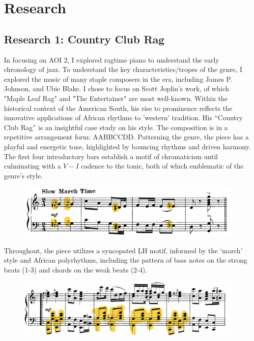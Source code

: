 \documentclass[11pt,a4paper]{article}
\begin{document}
\section{Research}

\subsection{Research 1: Country Club Rag}

In focusing on AOI 2, I explored ragtime piano to understand the early chronology of jazz. To understand the key characteristics/tropes of the genre, I explored the music of many staple composers in the era, including James P. Johnson, and Ubie Blake. I chose to focus on Scott Joplin’s work, of which "Maple Leaf Rag" and "The Entertainer" are most well-known. Within the historical context of the American South, his rise to prominence reflects the innovative applications of African rhythms to 'western' tradition.\autocite[45]{joplinArticle}
His “Country Club Rag” is an insightful case study on his style. The composition is in a repetitive arrangement form: AABBCCDD. Patterning the genre, the piece has a playful and energetic tone, highlighted by bouncing rhythms and driven harmony. The first four introductory bars establish a motif of chromaticism until culminating with a $V-I$ cadence to the tonic, both of which emblematic of the genre's style.
\begin{figure}[ht]
\begin{center}
\includegraphics[width=0.7\linewidth]{joplin1}
\end{center}
\end{figure}
Throughout, the piece utilizes a syncopated LH motif, informed by the ‘march’ style and African polyrhythms, including the pattern of bass notes on the strong beats (1-3) and chords on the weak beats (2-4). 
\begin{figure}[ht]
\begin{center}
\includegraphics[width=0.7\linewidth]{joplin2}
\end{center}
\end{figure}
\end{document}
